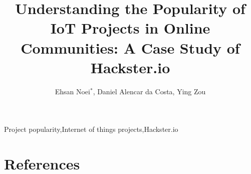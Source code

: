 \documentclass[review]{elsarticle}
\begin{document}
\begin{frontmatter}

	\title{Understanding the Popularity of IoT Projects in Online Communities: A Case Study of Hackster.io}
	\author{Ehsan Noei$^\ast$, Daniel Alencar da Costa, Ying Zou} 
	\address{Department of Electrical and Computer Engineering,\\ Queen's University, Kingston, Canada}
	\address{\{ehsan.noei, daniel.alencar, ying.zou\}@queensu.ca}

	\begin{abstract}\label{section:abstract}
		
	\end{abstract}

	\begin{keyword}
		Project popularity\sep Internet of things projects\sep Hackster.io
	\end{keyword}

\end{frontmatter}

\linenumbers
















\section*{References}


\end{document}
